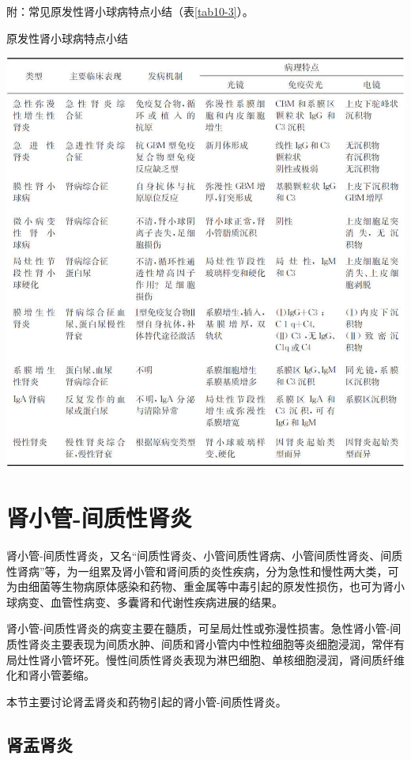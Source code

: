 附：常见原发性肾小球病特点小结（表\ref{tab10-3}）。

\begin{table}[htbp]
    \caption{原发性肾小球病特点小结}
    \label{tab10-3}
    \centering
    \includegraphics[width=\textwidth]{./images/Image00173.jpg}
\end{table}

\section{肾小管-间质性肾炎}

肾小管-间质性肾炎，又名“间质性肾炎、小管间质性肾病、小管间质性肾炎、间质性肾病”等，为一组累及肾小管和肾间质的炎性疾病，分为急性和慢性两大类，可为由细菌等生物病原体感染和药物、重金属等中毒引起的原发性损伤，也可为肾小球病变、血管性病变、多囊肾和代谢性疾病进展的结果。

肾小管-间质性肾炎的病变主要在髓质，可呈局灶性或弥漫性损害。急性肾小管-间质性肾炎主要表现为间质水肿、间质和肾小管内中性粒细胞等炎细胞浸润，常伴有局灶性肾小管坏死。慢性间质性肾炎表现为淋巴细胞、单核细胞浸润，肾间质纤维化和肾小管萎缩。

本节主要讨论肾盂肾炎和药物引起的肾小管-间质性肾炎。

\subsection{肾盂肾炎}

